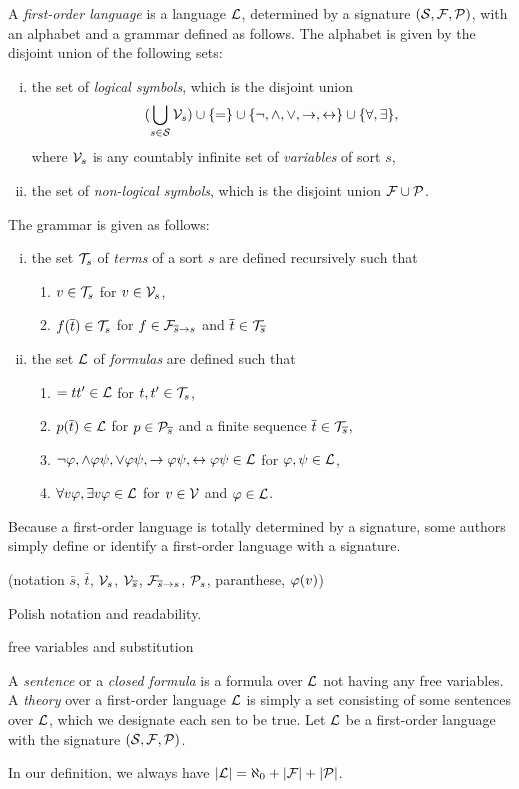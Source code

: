 \documentclass{../../large}
\begin{document}
\begin{prb}
A \emph{first-order language} is a language $\mathcal{L}$, determined by a signature $(\mathcal{S},\mathcal{F},\mathcal{P})$, with an alphabet and a grammar defined as follows.
The alphabet is given by the disjoint union of the following sets:
\begin{enumerate}[(i)]
\item the set of \emph{logical symbols}, which is the disjoint union
\[(\bigcup_{s\in\mathcal{S}}\mathcal{V}_s)\cup\{=\}\cup\{\neg,\wedge,\vee,\to,\leftrightarrow\}\cup\{\forall,\exists\},\]
where $\mathcal{V}_s$ is any countably infinite set of \emph{variables} of sort $s$,
\item the set of \emph{non-logical symbols}, which is the disjoint union $\mathcal{F}\cup\mathcal{P}$.
\end{enumerate}
The grammar is given as follows:
\begin{enumerate}[(i)]
\item the set $\mathcal{T}_s$ of \emph{terms} of a sort $s$ are defined recursively such that
\begin{enumerate}[(\text{i}.i)]
\item $v\in\mathcal{T}_s$ for $v\in\mathcal{V}_s$,
\item $f(\overline t)\in\mathcal{T}_s$ for $f\in\mathcal{F}_{\overline s\to s}$ and $\overline t\in\mathcal{T}_{\overline s}$
\end{enumerate}
\item the set $\mathcal{L}$ of \emph{formulas} are defined such that
\begin{enumerate}
\item $=tt'\in\mathcal{L}$ for $t,t'\in\mathcal{T}_s$,
\item $p(\overline t)\in\mathcal{L}$ for $p\in\mathcal{P}_{\overline s}$ and a finite sequence $\overline t\in\mathcal{T}_{\overline s}$,
\item $\neg\varphi,\wedge\varphi\psi,\vee\varphi\psi,\to\varphi\psi,\leftrightarrow\varphi\psi\in\mathcal{L}$ for $\varphi,\psi\in\mathcal{L}$,
\item $\forall v\varphi,\exists v\varphi\in\mathcal{L}$ for $v\in\mathcal{V}$ and $\varphi\in\mathcal{L}$.
\end{enumerate}
\end{enumerate}
Because a first-order language is totally determined by a signature, some authors simply define or identify a first-order language with a signature.

(notation $\bar s$, $\bar t$, $\mathcal{V}_s$, $\mathcal{V}_{\overline s}$, $\mathcal{F}_{\overline s\to s}$, $\mathcal{P}_s$, paranthese, $\varphi(v)$)

Polish notation and readability.


free variables and substitution

A \emph{sentence} or a \emph{closed formula} is a formula over $\mathcal{L}$ not having any free variables.
A \emph{theory} over a first-order language $\mathcal{L}$ is simply a set consisting of some sentences over $\mathcal{L}$, which we designate each sen to be true.
Let $\mathcal{L}$ be a first-order language with the signature $(\mathcal{S},\mathcal{F},\mathcal{P})$.
\begin{parts}
\item In our definition, we always have $|\mathcal{L}|=\aleph_0+|\mathcal{F}|+|\mathcal{P}|$.
\item 
\end{parts}
\end{prb}
\end{document}
